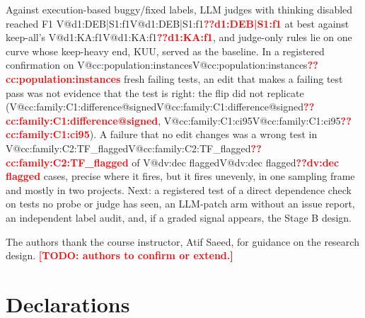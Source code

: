 \documentclass[pdflatex,iicol,sn-mathphys-num]{sn-jnl}
\makeatletter
\newcommand{\V}[1]{\ifcsname V@#1\endcsname\csname V@#1\endcsname\else\textbf{\textcolor{red}{??#1}}\fi}
\newcommand{\TODO}[1]{\textbf{\textcolor{red}{[TODO: #1]}}}
\makeatother
\begin{document}
Against execution-based buggy/fixed labels, LLM judges with thinking disabled reached F1 \V{d1:DEB|S1:f1} at best against keep-all's \V{d1:KA:f1}, and judge-only rules lie on one curve whose keep-heavy end, KUU, served as the baseline. In a registered confirmation on \V{cc:population:instances} fresh failing tests, an edit that makes a failing test pass was not evidence that the test is right: the flip did not replicate (\V{cc:family:C1:difference@signed}, \V{cc:family:C1:ci95}). A failure that no edit changes was a wrong test in \V{cc:family:C2:TF_flagged} of \V{dv:dec flagged} cases, precise where it fires, but it fires unevenly, in one sampling frame and mostly in two projects. Next: a registered test of a direct dependence check on tests no probe or judge has seen, an LLM-patch arm without an issue report, an independent label audit, and, if a graded signal appears, the Stage B design.

\backmatter

The authors thank the course instructor, Atif Saeed, for guidance on the research design. \TODO{authors to confirm or extend.}

\section*{Declarations}
\end{document}

